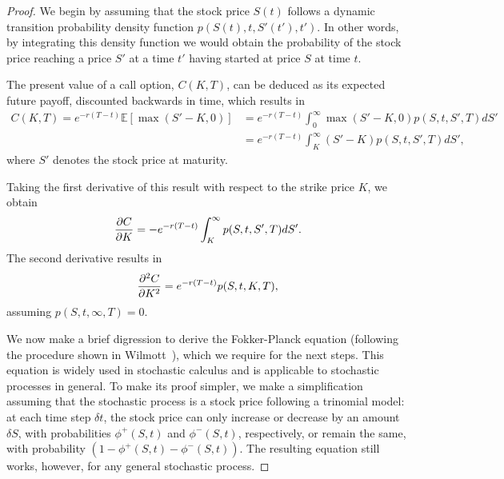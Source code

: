 \begin{proof}

We begin by assuming that the stock price $S(t)$ follows a dynamic transition probability density function $p(S(t),t,S'(t'),t')$. In other words, by integrating this density function we would obtain the probability of the stock price reaching a price $S'$ at a time $t'$ having started at price $S$ at time $t$.

The present value of a call option, $C(K,T)$, can be deduced as its expected future payoff, discounted backwards in time, which results in
\begin{equation}
\begin{split}\label{deriv0}
C(K,T)=e^{-r(T-t)}\mathbb{E}\left[\max\left(S'-K,0\right)\right]&=e^{-r(T-t)}\int_0^\infty\max\left(S'-K,0\right)p(S,t,S',T)dS'\\
&=e^{-r(T-t)}\int_K^\infty(S'-K)p(S,t,S',T)dS',
\end{split}
\end{equation}
\noindent where $S'$ denotes the stock price at maturity.

Taking the first derivative of this result with respect to the strike price $K$, we obtain
\begin{equation}\label{dcdk}
\pdv{C}{K}=-e^{-r(T-t)}\int_K^\infty p(S,t,S',T)dS'.
\end{equation}
The second derivative results in
\begin{equation}\label{d2cdk2}
\pdv{^2C}{K^2}=e^{-r(T-t)}p(S,t,K,T),
\end{equation}
\noindent assuming $p(S,t,\infty,T)=0$.

We now make a brief digression to derive the Fokker-Planck equation (following the procedure shown in Wilmott~\citep{Wilmott3}), which we require for the next steps. This equation is widely used in stochastic calculus and is applicable to stochastic processes in general.
To make its proof simpler, we make a simplification assuming that the stochastic process is a stock price following a trinomial model: at each time step $\delta t$, the stock price can only increase or decrease by an amount $\delta S$, with probabilities $\phi^+(S,t)$ and $\phi^-(S,t)$, respectively, or remain the same, with probability $(1-\phi^+(S,t)-\phi^-(S,t))$. The resulting equation still works, however, for any general stochastic process.



\end{proof}
